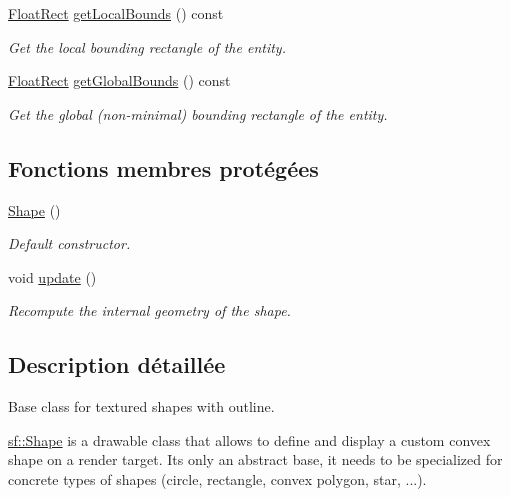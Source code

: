 \begin{DoxyCompactItemize}
\hyperlink{classsf_1_1Rect}{Float\+Rect} \hyperlink{classsf_1_1Shape_ae3294bcdf8713d33a862242ecf706443}{get\+Local\+Bounds} () const
\begin{DoxyCompactList}\small\item\em Get the local bounding rectangle of the entity. \end{DoxyCompactList}\item 
\hyperlink{classsf_1_1Rect}{Float\+Rect} \hyperlink{classsf_1_1Shape_ac0e29425d908d5442060cc44790fe4da}{get\+Global\+Bounds} () const
\begin{DoxyCompactList}\small\item\em Get the global (non-\/minimal) bounding rectangle of the entity. \end{DoxyCompactList}\end{DoxyCompactItemize}
\subsection*{Fonctions membres protégées}
\begin{DoxyCompactItemize}
\item 
\mbox{\label{classsf_1_1Shape_a413a457f720835b9f5d8e97ca8b80960}} 
\hyperlink{classsf_1_1Shape_a413a457f720835b9f5d8e97ca8b80960}{Shape} ()
\begin{DoxyCompactList}\small\item\em Default constructor. \end{DoxyCompactList}\item 
void \hyperlink{classsf_1_1Shape_adfb2bd966c8edbc5d6c92ebc375e4ac1}{update} ()
\begin{DoxyCompactList}\small\item\em Recompute the internal geometry of the shape. \end{DoxyCompactList}\end{DoxyCompactItemize}


\subsection{Description détaillée}
Base class for textured shapes with outline. 

\hyperlink{classsf_1_1Shape}{sf\+::\+Shape} is a drawable class that allows to define and display a custom convex shape on a render target. It\textquotesingle{}s only an abstract base, it needs to be specialized for concrete types of shapes (circle, rectangle, convex polygon, star, ...).


